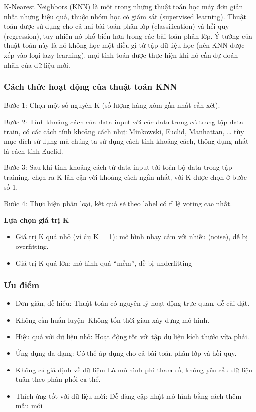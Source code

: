 \documentclass[
]{article}
\providecommand{\tightlist}{%
  \setlength{\itemsep}{0pt}\setlength{\parskip}{0pt}}
\begin{document}
K-Nearest Neighbors (KNN) là một trong những thuật toán học máy đơn giản
nhất nhưng hiệu quả, thuộc nhóm học có giám sát (supervised learning).
Thuật toán được sử dụng cho cả hai bài toán phân lớp (classification) và
hồi quy (regression), tuy nhiên nó phổ biến hơn trong các bài toán phân
lớp. Ý tưởng của thuật toán này là nó không học một điều gì từ tập dữ
liệu học (nên KNN được xếp vào loại lazy learning), mọi tính toán được
thực hiện khi nó cần dự đoán nhãn của dữ liệu mới.

\subsubsection{Cách thức hoạt động của thuật toán
KNN}\label{cuxe1ch-thux1ee9c-houx1ea1t-ux111ux1ed9ng-cux1ee7a-thuux1eadt-touxe1n-knn}

Bước 1: Chọn một số nguyên K (số lượng hàng xóm gần nhất cần xét).

Bước 2: Tính khoảng cách của data input với các data trong có trong tập
data train, có các cách tính khoảng cách như: Minkowski, Euclid,
Manhattan, \ldots{} tùy mục đích sử dụng mà chúng ta sử dụng cách tính
khoảng cách, thông dụng nhất là cách tính Euclid.

Bước 3: Sau khi tính khoảng cách từ data input tới toàn bộ data trong
tập training, chọn ra K lân cận với khoảng cách ngắn nhất, với K được
chọn ở bước số 1.

Bước 4: Thực hiện phân loại, kết quả sẽ theo label có tỉ lệ voting cao
nhất.

\textbf{Lựa chọn giá trị K}

\begin{itemize}
\tightlist
\item
  Giá trị K quá nhỏ (ví dụ K = 1): mô hình nhạy cảm với nhiễu (noise),
  dễ bị overfitting.
\item
  Giá trị K quá lớn: mô hình quá ``mềm'', dễ bị underfitting
\end{itemize}

\subsubsection{Ưu điểm}\label{ux1b0u-ux111iux1ec3m}

\begin{itemize}
\tightlist
\item
  Đơn giản, dễ hiểu: Thuật toán có nguyên lý hoạt động trực quan, dễ cài
  đặt.
\item
  Không cần huấn luyện: Không tốn thời gian xây dựng mô hình.
\item
  Hiệu quả với dữ liệu nhỏ: Hoạt động tốt với tập dữ liệu kích thước vừa
  phải.
\item
  Ứng dụng đa dạng: Có thể áp dụng cho cả bài toán phân lớp và hồi quy.
\item
  Không có giả định về dữ liệu: Là mô hình phi tham số, không yêu cầu dữ
  liệu tuân theo phân phối cụ thể.
\item
  Thích ứng tốt với dữ liệu mới: Dễ dàng cập nhật mô hình bằng cách thêm
  mẫu mới.
\end{itemize}
\end{document}
